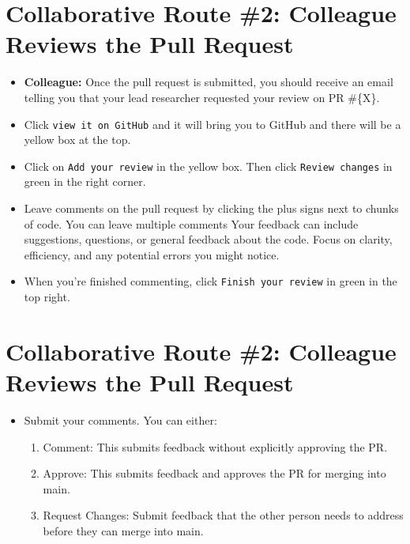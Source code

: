 \documentclass[
]{book}
\providecommand{\tightlist}{%
  \setlength{\itemsep}{0pt}\setlength{\parskip}{0pt}}
\begin{document}
\hypertarget{collaborative-route-2-colleague-reviews-the-pull-request}{%
\section{Collaborative Route \#2: Colleague Reviews the Pull Request}\label{collaborative-route-2-colleague-reviews-the-pull-request}}

\begin{itemize}
\tightlist
\item
  \textbf{Colleague:} Once the pull request is submitted, you should receive an email telling you that your lead researcher requested your review on PR \#\{X\}.
\item
  Click \texttt{view\ it\ on\ GitHub} and it will bring you to GitHub and there will be a yellow box at the top.
\item
  Click on \texttt{Add\ your\ review} in the yellow box. Then click \texttt{Review\ changes} in green in the right corner.
\item
  Leave comments on the pull request by clicking the plus signs next to chunks of code. You can leave multiple comments Your feedback can include suggestions, questions, or general feedback about the code. Focus on clarity, efficiency, and any potential errors you might notice.
\item
  When you're finished commenting, click \texttt{Finish\ your\ review} in green in the top right.
\end{itemize}

\hypertarget{collaborative-route-2-colleague-reviews-the-pull-request-1}{%
\section{Collaborative Route \#2: Colleague Reviews the Pull Request}\label{collaborative-route-2-colleague-reviews-the-pull-request-1}}

\begin{itemize}
\tightlist
\item
  Submit your comments. You can either:

  \begin{enumerate}
  \def\labelenumi{\arabic{enumi}.}
  \tightlist
  \item
    Comment: This submits feedback without explicitly approving the PR.
  \item
    Approve: This submits feedback and approves the PR for merging into main.
  \item
    Request Changes: Submit feedback that the other person needs to address before they can merge into main.
  \end{enumerate}
\end{itemize}
\end{document}
